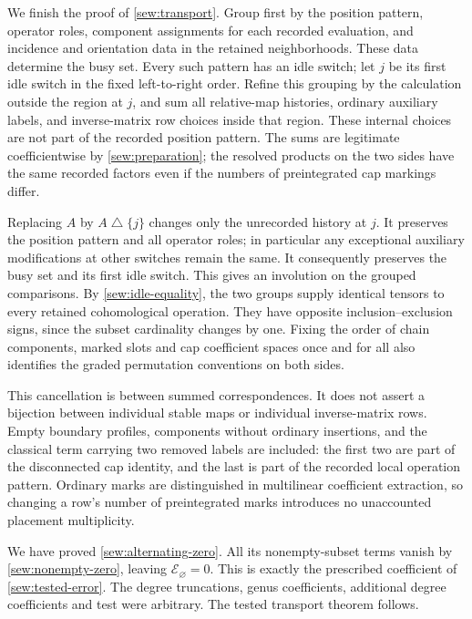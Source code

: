 We finish the proof of \cref{sew:transport}.  Group first by the
position pattern, operator roles, component assignments for each
recorded evaluation, and incidence and orientation data in the
retained neighborhoods.  These data determine the busy set.  Every
such pattern has an idle switch; let $j$ be its first idle switch in
the fixed left-to-right order.  Refine this grouping by the calculation
outside the region at $j$, and sum all relative-map histories,
ordinary auxiliary labels, and inverse-matrix row choices inside
that region.  These internal choices are not part of the recorded
position pattern.  The sums are legitimate coefficientwise by
\cref{sew:preparation}; the resolved products on the two sides have
the same recorded factors even if the numbers of preintegrated cap
markings differ.

Replacing $A$ by $A\mathbin{\triangle}\{j\}$ changes only the unrecorded
history at $j$.  It preserves the position pattern and all operator
roles; in particular any exceptional auxiliary modifications at other
switches remain the same.  It consequently preserves the busy set
and its first idle switch.  This gives an involution on the grouped
comparisons.  By \cref{sew:idle-equality}, the two groups supply
identical tensors to every retained cohomological operation.  They
have opposite inclusion--exclusion signs, since the subset cardinality
changes by one.  Fixing the order of chain components, marked slots
and cap coefficient spaces once and for all also identifies the
graded permutation conventions on both sides.

This cancellation is between summed correspondences.  It does not
assert a bijection between individual stable maps or individual
inverse-matrix rows.  Empty boundary profiles, components without
ordinary insertions, and the classical term carrying two removed
labels are included: the first two are part of the disconnected cap
identity, and the last is part of the recorded local operation
pattern.  Ordinary marks are distinguished in multilinear
coefficient extraction, so changing a row's number of preintegrated
marks introduces no unaccounted placement multiplicity.

We have proved \eqref{sew:alternating-zero}.  All its nonempty-subset
terms vanish by \eqref{sew:nonempty-zero}, leaving
$\mathcal E_{\varnothing}=0$.  This is exactly the prescribed
coefficient of \eqref{sew:tested-error}.  The degree truncations,
genus coefficients, additional degree coefficients and test were
arbitrary.  The tested transport theorem follows.
